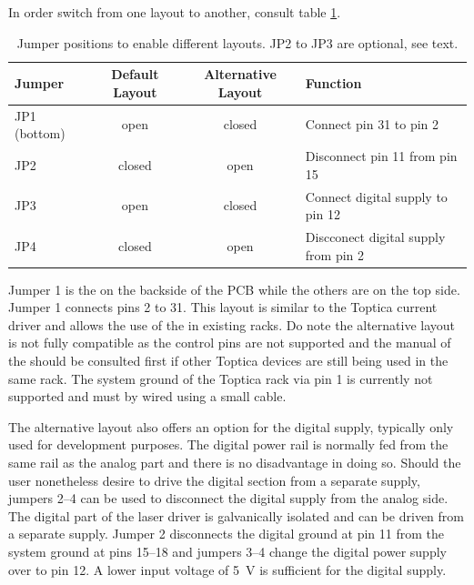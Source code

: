 In order switch from one layout to another, consult table \ref{tab:jumper_power_supply_layout}.
\begin{table}[hb]
    \centering
    \begin{tabular}{lccl}
        \toprule
        Jumper& Default Layout& Alternative Layout & Function\\
        \midrule
        JP1 (bottom)& open& closed& Connect pin \num{31} to pin \num{2}\\
        JP2& closed& open\footnotemark& Disconnect pin \num{11} from pin \num{15}\\
        JP3& open& closed\addtocounter{footnote}{-1}\addtocounter{Hfootnote}{-1}\footnotemark& Connect digital supply to pin \num{12}\\
        JP4& closed& open\addtocounter{footnote}{-1}\addtocounter{Hfootnote}{-1}\footnotemark& Discconect digital supply from pin \num{2}\\
        \bottomrule
    \end{tabular}
    \caption{Jumper positions to enable different layouts. JP2 to JP3 are optional, see text.}
    \label{tab:jumper_power_supply_layout}
\end{table}

Jumper \num{1} is the on the backside of the PCB while the others are on the top side. Jumper \num{1} connects pins \num{2} to \num{31}. This layout is similar to the Toptica  current driver and allows the use of the  in existing racks. Do note the alternative layout is not fully compatible as the control pins are not supported and the manual of the  should be consulted first if other Toptica devices are still being used in the same rack. The system ground of the Toptica rack via pin \num{1} is currently not supported and must by wired using a small cable.

The alternative layout also offers an option for the digital supply, typically only used for development purposes. The digital power rail is normally fed from the same rail as the analog part and there is no disadvantage in doing so. Should the user nonetheless desire to drive the digital section from a separate supply, jumpers \numrange{2}{4} can be used to disconnect the digital supply from the analog side. The digital part of the laser driver is galvanically isolated and can be driven from a separate supply. Jumper \num{2} disconnects the digital ground at pin \num{11} from the system ground at pins \numrange{15}{18} and jumpers \numrange{3}{4} change the digital power supply over to pin \num{12}. A lower input voltage of \qty{5}{\V} is sufficient for the digital supply.


